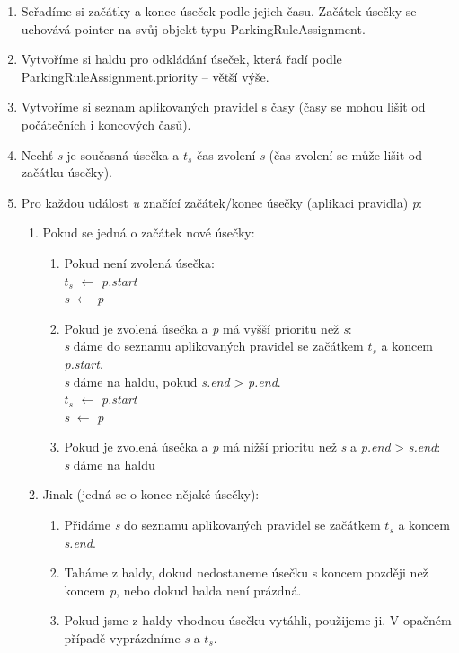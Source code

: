 \begin{enumerate}
  \setlength\itemsep{.05em}
  \item Seřadíme si začátky a konce úseček podle jejich času. Začátek úsečky se uchovává pointer na svůj objekt typu ParkingRuleAssignment.
  \item Vytvoříme si haldu pro odkládání úseček, která řadí podle ParkingRuleAssignment.priority -- větší výše.
  \item Vytvoříme si seznam aplikovaných pravidel s časy (časy se mohou lišit od počátečních i koncových časů).
  \item Nechť \textit{s} je současná úsečka a \textit{$t_s$} čas zvolení \textit{s} (čas zvolení se může lišit od začátku úsečky).
  \item Pro každou událost \textit{u} značící začátek/konec úsečky (aplikaci pravidla) \textit{p}:
  \begin{enumerate}
    \item Pokud se jedná o začátek nové úsečky:
    \begin{enumerate}
      \item Pokud není zvolená úsečka:\\
            \textit{$t_s$} $\leftarrow$ \textit{p.start}\\
            \textit{s} $\leftarrow$ \textit{p}
      \item Pokud je zvolená úsečka a \textit{p} má vyšší prioritu než \textit{s}:\\
            \textit{s} dáme do seznamu aplikovaných pravidel se začátkem \textit{$t_s$} a koncem \textit{p.start}.\\
            \textit{s} dáme na haldu, pokud \textit{s.end} > \textit{p.end}.\\
            \textit{$t_s$} $\leftarrow$ \textit{p.start}\\
            \textit{s} $\leftarrow$ \textit{p}
      \item Pokud je zvolená úsečka a \textit{p} má nižší prioritu než \textit{s} a \textit{p.end} > \textit{s.end}:\\
            \textit{s} dáme na haldu
    \end{enumerate}
    \item Jinak (jedná se o konec nějaké úsečky):
    \begin{enumerate}
      \item Přidáme \textit{s} do seznamu aplikovaných pravidel se začátkem \textit{$t_s$} a koncem \textit{s.end}.
      \item Taháme z haldy, dokud nedostaneme úsečku s koncem později než koncem \textit{p}, nebo dokud halda není prázdná.
      \item Pokud jsme z haldy vhodnou úsečku vytáhli, použijeme ji. V opačném případě vyprázdníme \textit{s} a \textit{$t_s$}.
    \end{enumerate}
  \end{enumerate}
\end{enumerate}


